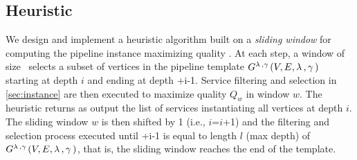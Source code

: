 
\subsection{Heuristic}\label{subsec:heuristics}
We design and implement a heuristic algorithm built on a \emph{sliding window} for computing the pipeline instance maximizing quality \q. 
At each step, a window of size \windowsize\ selects a subset of vertices in the pipeline template $G^{\lambda\,,\gamma\,}(V,E,\lambda\,,\gamma\,)$ starting at depth $i$ and ending at depth \windowsize+i-1.
Service filtering and selection in \cref{sec:instance} are then executed to maximize quality $Q_w$ in window $w$. The heuristic returns as output the list of services instantiating all vertices at depth $i$. The sliding window $w$ is then shifted by 1 (i.e., $i$=$i$+1) and the filtering and selection process executed until \windowsize+i-1 is equal to length $l$ (max depth) of $G^{\lambda\,,\gamma\,}(V,E,\lambda\,,\gamma\,)$, that is, the sliding window reaches the end of the template.

